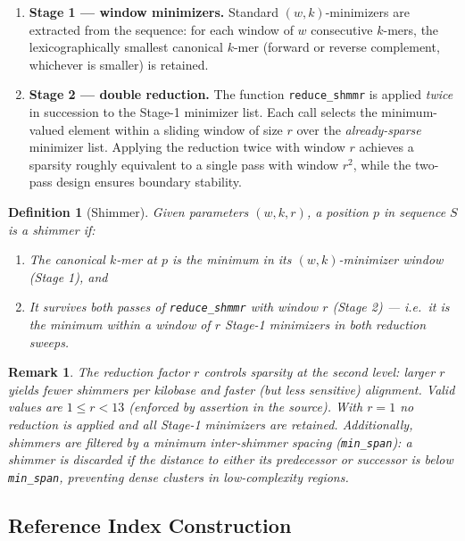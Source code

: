 \documentclass[11pt,a4paper]{article}
\newtheorem{definition}{Definition}[section]
\newtheorem{remark}{Remark}[section]
\begin{document}
\begin{enumerate}
  \item \textbf{Stage 1 — window minimizers.}
        Standard $(w, k)$-minimizers are extracted from the sequence:
        for each window of $w$ consecutive $k$-mers, the lexicographically
        smallest canonical $k$-mer (forward or reverse complement, whichever
        is smaller) is retained.

  \item \textbf{Stage 2 — double reduction.}
        The function \texttt{reduce\_shmmr} is applied \emph{twice} in
        succession to the Stage-1 minimizer list.
        Each call selects the minimum-valued element within a sliding window
        of size $r$ over the \emph{already-sparse} minimizer list.
        Applying the reduction twice with window $r$ achieves a sparsity
        roughly equivalent to a single pass with window $r^2$, while the
        two-pass design ensures boundary stability.
\end{enumerate}

\begin{definition}[Shimmer]
  Given parameters $(w, k, r)$, a position $p$ in sequence $S$ is a shimmer if:
  \begin{enumerate}[noitemsep]
    \item The canonical $k$-mer at $p$ is the minimum in its $(w,k)$-minimizer
          window (Stage 1), and
    \item It survives both passes of \texttt{reduce\_shmmr} with window $r$
          (Stage 2) — i.e.\ it is the minimum within a window of $r$ Stage-1
          minimizers in both reduction sweeps.
  \end{enumerate}
\end{definition}

\begin{remark}
  The reduction factor $r$ controls sparsity at the second level: larger $r$
  yields fewer shimmers per kilobase and faster (but less sensitive) alignment.
  Valid values are $1 \leq r < 13$ (enforced by assertion in the source).
  With $r=1$ no reduction is applied and all Stage-1 minimizers are retained.
  Additionally, shimmers are filtered by a minimum inter-shimmer spacing
  (\texttt{min\_span}): a shimmer is discarded if the distance to either its
  predecessor or successor is below \texttt{min\_span}, preventing dense
  clusters in low-complexity regions.
\end{remark}

\subsection{Reference Index Construction}
\end{document}
